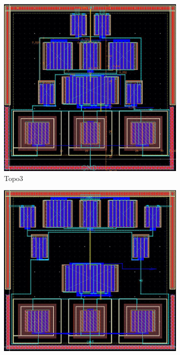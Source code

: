 \begin{figure}[ht]
\begin{subfigure}[t]{0.2\textwidth}
      \includegraphics[width=\textwidth]{Fig/MultTopo_Topo3.eps}
      \caption{Topo3}\label{fig:Topo3}
      \end{subfigure}
      \begin{subfigure}[t]{0.2\textwidth}
      \includegraphics[width=\textwidth]{Fig/MultTopo_Topo4.eps}

\end{subfigure}
\end{figure}
